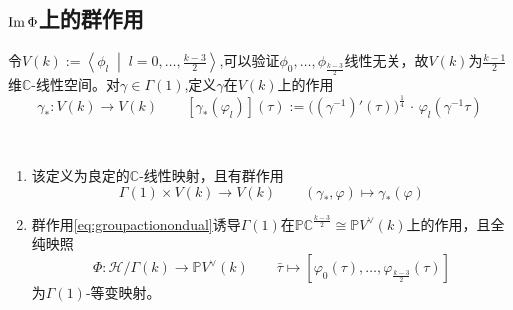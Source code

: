 \subsection{$\operatorname{\operatorname{Im}} \Phi$上的群作用}
令$V(k):=\left<\phi_l \;\middle|\; l=0,\ldots,\frac{k-3}{2}  \right>$,可以验证$\phi_0,\ldots, \phi_{\frac{k-3}{2}}$线性无关，故$V(k)$为$\frac{k-1}{2}$维$\mathbb{C}$-线性空间。对$\gamma \in \Gamma(1)$,定义$\gamma$在$V(k)$上的作用
$$\gamma_*\colon V(k) \longrightarrow V(k) \qquad \left[\gamma_* (\varphi_l) \right](\tau):=\big((\gamma^{-1})'(\tau)\big)^{\frac{1}{4}} \,\cdot \,\varphi_l(\gamma^{-1}\tau)$$
\begin{theorem}\
	\begin{enumerate}[(1)]
		\item 该定义为良定的$\mathbb{C}$-线性映射，且有群作用
		\begin{equation}\label{eq:groupactionondual}
		\Gamma(1) \times V(k) \longrightarrow V(k) \qquad (\gamma_*,\varphi) \longmapsto \gamma_*(\varphi)
		\end{equation}
		\item 群作用\eqref{eq:groupactionondual}诱导$\Gamma(1)$在$\mathbb{PC}^{\frac{k-3}{2}} \cong \mathbb{P}V^{\vee}(k)$上的作用，且全纯映照
		$$\Phi: \mathcal{H}/\Gamma(k) \longrightarrow \mathbb{P}V^{\vee}(k) \qquad \bar{\tau} \longmapsto \left[ \varphi_0(\tau),\ldots , \varphi_{\frac{k-3}{2}}(\tau) \right]$$
		为$\Gamma(1)$-等变映射。
	\end{enumerate}
	
\end{theorem}
